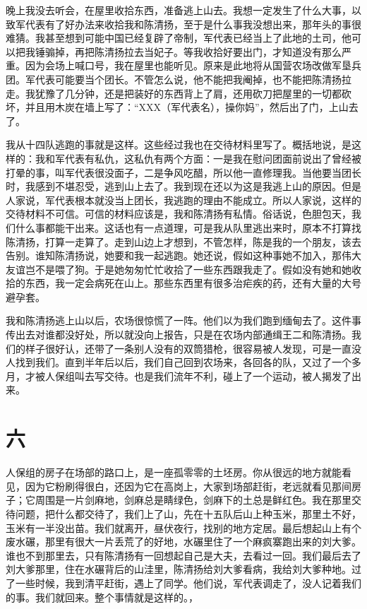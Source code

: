  晚上我没去听会，在屋里收拾东西，准备逃上山去。我想一定发生了什么大事，以致军代表有了好办法来收拾我和陈清扬，至于是什么事我没想出来，那年头的事很难猜。我甚至想到可能中国已经复辟了帝制，军代表已经当上了此地的土司，他可以把我锤骟掉，再把陈清扬拉去当妃子。等我收拾好要出门，才知道没有那么严重。因为会场上喊口号，我在屋里也能听见。原来是此地将从国营农场改做军垦兵团。军代表可能要当个团长。不管怎么说，他不能把我阉掉，也不能把陈清扬拉走。我犹豫了几分钟，还是把装好的东西背上了肩，还用砍刀把屋里的一切都砍坏，并且用木炭在墙上写了：“XXX（军代表名），操你妈”，然后出了门，上山去了。 
 
 我从十四队逃跑的事就是这样。这些经过我也在交待材料里写了。概括地说，是这样的：我和军代表有私仇，这私仇有两个方面：一是我在慰问团面前说出了曾经被打晕的事，叫军代表很没面子，二是争风吃醋，所以他一直修理我。当他要当团长时，我感到不堪忍受，逃到山上去了。我到现在还以为这是我逃上山的原因。但是人家说，军代表根本就没当上团长，我逃跑的理由不能成立。所以人家说，这样的交待材料不可信。可信的材料应该是，我和陈清扬有私情。俗话说，色胆包天，我们什么事都能干出来。这话也有一点道理，可是我从队里逃出来时，原本不打算找陈清扬，打算一走算了。走到山边上才想到，不管怎样，陈是我的一个朋友，该去告别。谁知陈清扬说，她要和我一起逃跑。她还说，假如这种事她不加入，那伟大友谊岂不是喂了狗。于是她匆匆忙忙收拾了一些东西跟我走了。假如没有她和她收拾的东西，我一定会病死在山上。那些东西里有很多治疟疾的药，还有大量的大号避孕套。 
 
 我和陈清扬逃上山以后，农场很惊慌了一阵。他们以为我们跑到缅甸去了。这件事传出去对谁都没好处，所以就没向上报告，只是在农场内部通缉王二和陈清扬。我们的样子很好认，还带了一条别人没有的双筒猎枪，很容易被人发现，可是一直没人找到我们。直到半年后以后，我们自己回到农场来，各回各的队，又过了一个多月，才被人保组叫去写交待。也是我们流年不利，碰上了一个运动，被人揭发了出来。 

\section{六} 
 
人保组的房子在场部的路口上，是一座孤零零的土坯房。你从很远的地方就能看见，因为它粉刷得很白，还因为它在高岗上，大家到场部赶街，老远就看见那间房子；它周围是一片剑麻地，剑麻总是睛绿色，剑麻下的土总是鲜红色。我在那里交待问题，把什么都交待了，我们上了山，先在十五队后山上种玉米，那里土不好，玉米有一半没出苗。我们就离开，昼伏夜行，找别的地方定居。最后想起山上有个废水碾，那里有很大一片丢荒了的好地，水碾里住了一个麻疯寨跑出来的刘大爹。谁也不到那里去，只有陈清扬有一回想起自己是大夫，去看过一回。我们最后去了刘大爹那里，住在水碾背后的山洼里，陈清扬给刘大爹看病，我给刘大爹种地。过了一些时候，我到清平赶街，遇上了同学。他们说，军代表调走了，没人记着我们的事。我们就回来。整个事情就是这样的。， 
 
